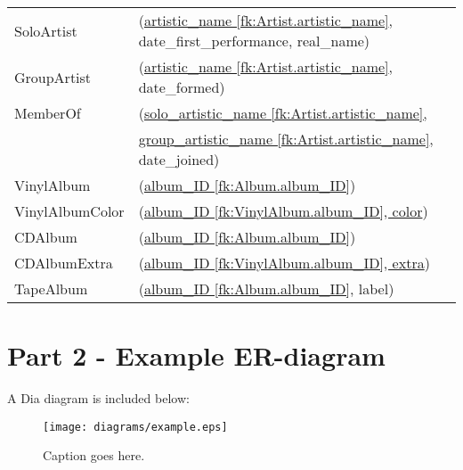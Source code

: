 \documentclass[11pt,a4paper]{article}
\begin{document}
\begin{table}[h]
\begin{tabular}{ll}
SoloArtist  & (\underline{artistic\_name [fk:Artist.artistic\_name]}, 
	            date\_first\_performance, real\_name) \\

GroupArtist	& (\underline{artistic\_name [fk:Artist.artistic\_name]},
              date\_formed) \\

MemberOf    & (\underline{solo\_artistic\_name [fk:Artist.artistic\_name], }\\
            & \underline{group\_artistic\_name [fk:Artist.artistic\_name]},
              date\_joined)\\
 
VinylAlbum  &  (\underline{album\_ID [fk:Album.album\_ID]}) \\

VinylAlbumColor & (\underline{album\_ID [fk:VinylAlbum.album\_ID], color}) \\

CDAlbum  & (\underline{album\_ID [fk:Album.album\_ID]}) \\

CDAlbumExtra & (\underline{album\_ID [fk:VinylAlbum.album\_ID], extra}) \\

TapeAlbum & (\underline{album\_ID [fk:Album.album\_ID]}, label) 
\end{tabular}
\end{table}


\section{Part 2 - Example ER-diagram}

A Dia diagram is included below:

\begin{figure}[!htbp]      
   	\centering
	\centerline{\texttt{[image: diagrams/example.eps]}}
	\caption{Caption goes here.}
	\label{fig:test-figure}
\end{figure}
\end{document}
